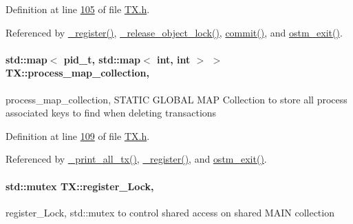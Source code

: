 Definition at line \hyperlink{_t_x_8h_source_l00105}{105} of file \hyperlink{_t_x_8h_source}{T\+X.\+h}.



Referenced by \hyperlink{_t_x_8cpp_source_l00096}{\+\_\+register()}, \hyperlink{_t_x_8cpp_source_l00253}{\+\_\+release\+\_\+object\+\_\+lock()}, \hyperlink{_t_x_8cpp_source_l00177}{commit()}, and \hyperlink{_t_x_8cpp_source_l00068}{ostm\+\_\+exit()}.

\paragraph[{\texorpdfstring{process\+\_\+map\+\_\+collection}{process_map_collection}}]{\setlength{\rightskip}{0pt plus 5cm}std\+::map$<$ pid\+\_\+t, std\+::map$<$ int, int $>$ $>$ T\+X\+::process\+\_\+map\+\_\+collection\hspace{0.3cm}{\ttfamily [static]}, {\ttfamily [private]}}\hypertarget{class_t_x_a2e3cd2f52fd93cf6ef3eb3c1cb830b9f_a2e3cd2f52fd93cf6ef3eb3c1cb830b9f}{}\label{class_t_x_a2e3cd2f52fd93cf6ef3eb3c1cb830b9f_a2e3cd2f52fd93cf6ef3eb3c1cb830b9f}
process\+\_\+map\+\_\+collection, S\+T\+A\+T\+IC G\+L\+O\+B\+AL M\+AP Collection to store all process associated keys to find when deleting transactions 

Definition at line \hyperlink{_t_x_8h_source_l00109}{109} of file \hyperlink{_t_x_8h_source}{T\+X.\+h}.



Referenced by \hyperlink{_t_x_8cpp_source_l00311}{\+\_\+print\+\_\+all\+\_\+tx()}, \hyperlink{_t_x_8cpp_source_l00096}{\+\_\+register()}, and \hyperlink{_t_x_8cpp_source_l00068}{ostm\+\_\+exit()}.

\paragraph[{\texorpdfstring{register\+\_\+\+Lock}{register_Lock}}]{\setlength{\rightskip}{0pt plus 5cm}std\+::mutex T\+X\+::register\+\_\+\+Lock\hspace{0.3cm}{\ttfamily [static]}, {\ttfamily [private]}}\hypertarget{class_t_x_aa688a8c96fa3cdf8cd92e267463536dc_aa688a8c96fa3cdf8cd92e267463536dc}{}\label{class_t_x_aa688a8c96fa3cdf8cd92e267463536dc_aa688a8c96fa3cdf8cd92e267463536dc}
register\+\_\+\+Lock, std\+::mutex to control shared access on shared M\+A\+IN collection 

